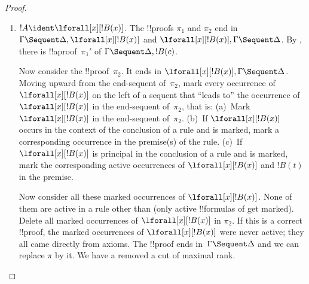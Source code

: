 \documentclass[../../../include/open-logic-section]{subfiles}
\begin{document}
\begin{proof}
\begin{enumerate}
  $\pi_2''$ of $!C, \Gamma \Sequent \Delta$. By applying
   to $\pi_2''$ we also get
  !!a{proof}~$\pi_2'''$ of $!C, !B, \Gamma \Sequent \Delta$. The
  !!{proof}~$\pi'$ is:
  \[
  \AxiomC{}
  \RightLabel{$\pi_2'$}
  \Deduce$\Gamma \fCenter \Delta, !B$
  \AxiomC{}
  \RightLabel{$\pi_1'$}
  \Deduce$!B, \Gamma \fCenter \Delta, !C$
  \AxiomC{}
  \RightLabel{$\pi_2'''$}
  \Deduce$!C, !B, \Gamma \fCenter \Delta$
  \RightLabel{\CutCS}
  \BinaryInf$!B, \Gamma \fCenter \Delta$
  \RightLabel{\CutCS}
  \BinaryInf$\Gamma \fCenter \Delta$
  \DisplayProof
  \]
  \item $!A \ident \lforall[x][!B(x)]$. The !!{proof}s $\pi_1$ and
  $\pi_2$ end in $\Gamma \Sequent \Delta, \lforall[x][!B(x)]$ and
  $\lforall[x][!B(x)], \Gamma \Sequent \Delta$. By
  , there is !!a{proof}~$\pi_1'$ of $\Gamma
  \Sequent \Delta, !B(c)$.

  Now consider the !!{proof}~$\pi_2$. It ends in $\lforall[x][!B(x)],
  \Gamma \Sequent \Delta$. Moving upward from the end-sequent
  of~$\pi_2$, mark every occurrence of $\lforall[x][!B(x)]$ on the
  left of a sequent that ``leads to'' the occurrence of
  $\lforall[x][!B(x)]$ in the end-sequent of~$\pi_2$, that is:
  (a)~Mark $\lforall[x][!B(x)]$ in the end-sequent of~$\pi_2$. (b)~If
  $\lforall[x][!B(x)]$ occurs in the context of the conclusion of a
  rule and is marked, mark a corresponding occurrence in the
  premise(s) of the rule. (c)~If $\lforall[x][!B(x)]$ is principal in
  the conclusion of a \LeftR{\lforall} rule and is marked, mark the
  corresponding active occurrences of $\lforall[x][!B(x)]$ and $!B(t)$
  in the premise.
  
  Now consider all these marked occurrences of $\lforall[x][!B(x)]$.
  None of them are active in a rule other than \LeftR{\lforall} (only
  active !!{formula}s of \LeftR{\lforall} get marked). Delete all
  marked occurrences of $\lforall[x][!B(x)]$ in $\pi_2$.
  If this is a correct !!{proof}, the marked occurrences of
  $\lforall[x][!B(x)]$ were never active; they all came directly from
  axioms. The !!{proof} ends in~$\Gamma \Sequent \Delta$ and we can
  replace $\pi$ by it. We have a removed a cut of maximal rank.


\end{enumerate}
\end{proof}
\end{document}
